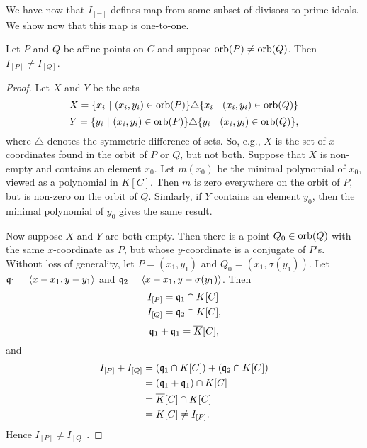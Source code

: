 We have now that $I_{[-]}$ defines map from some subset of divisors to prime ideals.
We show now that this map is one-to-one.
\begin{proposition}
  Let $P$ and $Q$ be affine points on $C$ and suppose $\orb(P) \neq \orb(Q)$.
  Then $I_{[P]} \neq I_{[Q]}$.
\end{proposition}
\begin{proof}
  Let $X$ and $Y$ be the sets
    \[ X = \{ x_i ~|~ (x_i, y_i) \in \orb(P) \} \triangle \{ x_i ~|~ (x_i, y_i) \in \orb(Q) \} \]
    \[ Y = \{ y_i ~|~ (x_i, y_i) \in \orb(P) \} \triangle \{ y_i ~|~ (x_i, y_i) \in \orb(Q) \}, \]
    where $\triangle$ denotes the symmetric difference of sets.
  So, e.g., $X$ is the set of $x$-coordinates found in the orbit of $P$ or $Q$, but not both.
  Suppose that $X$ is non-empty and contains an element $x_0$.
  Let $m(x_0)$ be the minimal polynomial of $x_0$, viewed as a polynomial in $K[C]$.
  Then $m$ is zero everywhere on the orbit of $P$, but is non-zero on the orbit of $Q$.
  Simlarly, if $Y$ contains an element $y_0$, then the minimal polynomial of $y_0$ gives the same result.

  Now suppose $X$ and $Y$ are both empty.
  Then there is a point $Q_0 \in \orb(Q)$ with the same $x$-coordinate as $P$, but whose $y$-coordinate is a conjugate of $P$'s.
  Without loss of generality, let $P = (x_1, y_1)$ and $Q_0 = (x_1, \sigma(y_1))$.
  Let $\frak q_1 = \pid{x - x_1, y - y_1}$ and $\frak q_2 = \pid{x - x_1, y - \sigma(y_1)}$. Then
  \begin{align*}
    I_{[P]} &= \frak q_1 \cap K[C] \\
    I_{[Q]} &= \frak q_2 \cap K[C],
  \end{align*}
  \[ \frak q_1 + \frak q_1 = \bar K[C], \]
  and
  \begin{align*}
    I_{[P]} + I_{[Q]}
      &= (\frak q_1 \cap K[C]) + (\frak q_2 \cap K[C]) \\
      &= (\frak q_1  + \frak q_1) \cap K[C] \\
      &= \bar K[C] \cap K[C] \\
      &= K[C] \neq I_{[P]}.
  \end{align*}
  Hence $I_{[P]} \neq I_{[Q]}$.
\end{proof}


